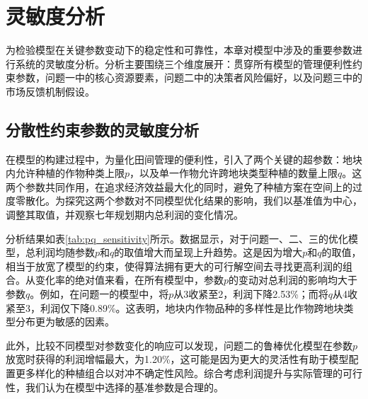 \section{灵敏度分析}

为检验模型在关键参数变动下的稳定性和可靠性，本章对模型中涉及的重要参数进行系统的灵敏度分析。分析主要围绕三个维度展开：贯穿所有模型的管理便利性约束参数，问题一中的核心资源要素，问题二中的决策者风险偏好，以及问题三中的市场反馈机制假设。

\subsection{分散性约束参数的灵敏度分析}

在模型的构建过程中，为量化田间管理的便利性，引入了两个关键的超参数：地块内允许种植的作物种类上限$p$，以及单一作物允许跨地块类型种植的数量上限$q$。这两个参数共同作用，在追求经济效益最大化的同时，避免了种植方案在空间上的过度零散化。为探究这两个参数对不同模型优化结果的影响，我们以基准值为中心，调整其取值，并观察七年规划期内总利润的变化情况。

分析结果如表\ref{tab:pq_sensitivity}所示。数据显示，对于问题一、二、三的优化模型，总利润均随参数$p$和$q$的取值增大而呈现上升趋势。这是因为增大$p$和$q$的取值，相当于放宽了模型的约束，使得算法拥有更大的可行解空间去寻找更高利润的组合。从变化率的绝对值来看，在所有模型中，参数$p$的变动对总利润的影响均大于参数$q$。例如，在问题一的模型中，将$p$从3收紧至2，利润下降2.53\%；而将$q$从4收紧至3，利润仅下降0.89\%。这表明，地块内作物品种的多样性是比作物跨地块类型分布更为敏感的因素。

此外，比较不同模型对参数变化的响应可以发现，问题二的鲁棒优化模型在参数$p$放宽时获得的利润增幅最大，为1.20\%，这可能是因为更大的灵活性有助于模型配置更多样化的种植组合以对冲不确定性风险。综合考虑利润提升与实际管理的可行性，我们认为在模型中选择的基准参数是合理的。

